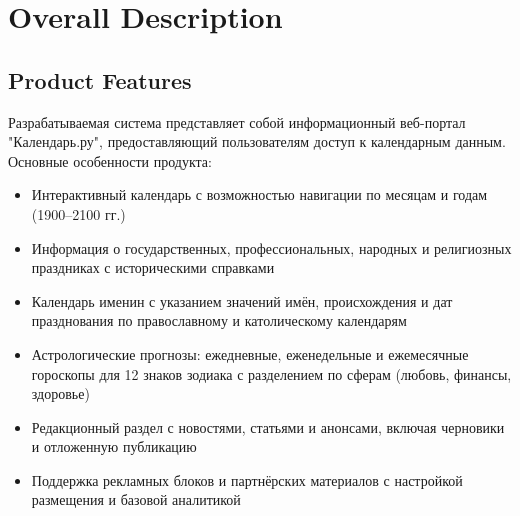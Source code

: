 \section{Overall Description}

\subsection{Product Features}
Разрабатываемая система представляет собой информационный веб-портал
"Календарь.ру", предоставляющий пользователям доступ к
календарным данным. Основные особенности продукта:
\begin{itemize}[leftmargin=*]
    \item Интерактивный календарь с возможностью навигации по месяцам и годам (1900–2100 гг.)
    \item Информация о государственных, профессиональных, народных и религиозных праздниках с историческими справками
    \item Календарь именин с указанием значений имён, происхождения и дат празднования по православному и католическому календарям
    \item Астрологические прогнозы: ежедневные, еженедельные и ежемесячные гороскопы для 12 знаков зодиака с разделением по сферам (любовь, финансы, здоровье)
    \item Редакционный раздел с новостями, статьями и анонсами, включая черновики и отложенную публикацию
    \item Поддержка рекламных блоков и партнёрских материалов с настройкой размещения и базовой аналитикой
\end{itemize}

